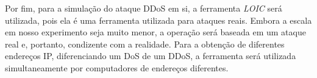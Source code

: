 Por fim, para a simulação do ataque DDoS em si, a ferramenta \emph{LOIC} será utilizada, pois ela é uma ferramenta utilizada para ataques reais. Embora a escala em nosso experimento seja muito menor, a operação será baseada em um ataque real e, portanto, condizente com a realidade. Para a obtenção de diferentes endereços IP, diferenciando um DoS de um DDoS, a ferramenta será utilizada simultaneamente por computadores de endereços diferentes.